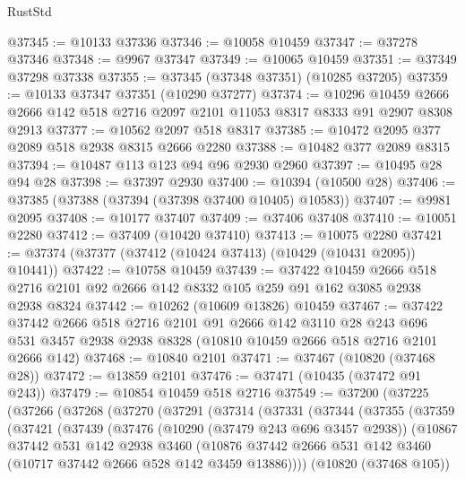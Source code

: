 \begin{lexlean}{RustStd}
\begin{coremodule}
@37345 := @10133 @37336
@37346 := @10058 @10459
@37347 := @37278 @37346
@37348 := @9967 @37347
@37349 := @10065 @10459
@37351 := @37349 @37298 @37338
@37355 := @37345 (@37348 @37351) (@10285 @37205)
@37359 := @10133 @37347 @37351 (@10290 @37277)
@37374 := @10296
    @10459
    @2666
    @2666
    @142
    @518
    @2716
    @2097
    @2101
    @11053
    @8317
    @8333
    @91
    @2907
    @8308
    @2913
@37377 := @10562 @2097 @518 @8317
@37385 := @10472 @2095 @377 @2089 @518 @2938 @8315 @2666 @2280
@37388 := @10482 @377 @2089 @8315
@37394 := @10487 @113 @123 @94 @96 @2930 @2960
@37397 := @10495 @28 @94 @28
@37398 := @37397 @2930
@37400 := @10394 (@10500 @28)
@37406 := @37385 (@37388 (@37394 (@37398 @37400 @10405) @10583))
@37407 := @9981 @2095
@37408 := @10177 @37407
@37409 := @37406 @37408
@37410 := @10051 @2280
@37412 := @37409 (@10420 @37410)
@37413 := @10075 @2280
@37421 := @37374 (@37377 (@37412 (@10424 @37413) (@10429 (@10431 @2095)) @10441))
@37422 := @10758 @10459
@37439 := @37422
    @10459
    @2666
    @518
    @2716
    @2101
    @92
    @2666
    @142
    @8332
    @105
    @259
    @91
    @162
    @3085
    @2938
    @2938
    @8324
@37442 := @10262 (@10609 @13826) @10459
@37467 := @37422
    @37442
    @2666
    @518
    @2716
    @2101
    @91
    @2666
    @142
    @3110
    @28
    @243
    @696
    @531
    @3457
    @2938
    @2938
    @8328
    (@10810 @10459 @2666 @518 @2716 @2101 @2666 @142)
@37468 := @10840 @2101
@37471 := @37467 (@10820 (@37468 @28))
@37472 := @13859 @2101
@37476 := @37471 (@10435 (@37472 @91 @243))
@37479 := @10854 @10459 @518 @2716
@37549 := @37200
    (@37225
      (@37266
        (@37268
          (@37270
            (@37291
              (@37314
                (@37331
                  (@37344
                    (@37355
                      (@37359
                        (@37421
                          (@37439
                            (@37476
                              (@10290 (@37479 @243 @696 @3457 @2938))
                              (@10867
                                @37442
                                @531
                                @142
                                @2938
                                @3460
                                (@10876
                                  @37442
                                  @2666
                                  @531
                                  @142
                                  @3460
                                  (@10717 @37442 @2666 @528 @142 @3459 @13886))))
                            (@10820 (@37468 @105))

\end{coremodule}
\end{lexlean}
